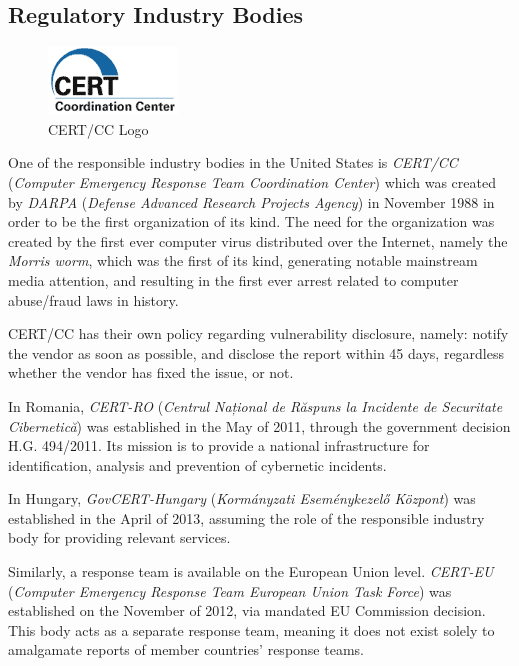 \documentclass[a4paper,12pt]{article}
\begin{document}
\subsection{Regulatory Industry Bodies}
	
	\begin{figure}
		\vspace{-10pt}
		\centering
		\includegraphics[scale=0.75]{cert.png}
		\caption{CERT/CC Logo}
	\end{figure}
	
	One of the responsible industry bodies in the United States is \textit{CERT/CC} (\textit{Computer Emergency Response Team Coordination Center}) which was created by \textit{DARPA} (\textit{Defense Advanced Research Projects Agency}) in November 1988 in order to be the first organization of its kind. The need for the organization was created by the first ever computer virus distributed over the Internet, namely the \textit{Morris worm}\cite{cert15}, which was the first of its kind, generating notable mainstream media attention, and resulting in the first ever arrest related to computer abuse/fraud laws in history.
	
	CERT/CC has their own policy regarding vulnerability disclosure, namely: notify the vendor as soon as possible, and disclose the report within 45 days, regardless whether the vendor has fixed the issue, or not.
	
	In Romania, \textit{CERT-RO} (\textit{Centrul Național de Răspuns la Incidente de Securitate Cibernetică}) was established in the May of 2011, through the government decision H.G. 494/2011\cite{certro12}. Its mission is to provide a national infrastructure for identification, analysis and prevention of cybernetic incidents.
	
	In Hungary, \textit{GovCERT-Hungary} (\textit{Kormányzati Eseménykezelő Központ}) was established in the April of 2013\cite{certhu13}, assuming the role of the responsible industry body for providing relevant services.
	
	Similarly, a response team is available on the European Union level. \textit{CERT-EU} (\textit{Computer Emergency Response Team European Union Task Force}) was established on the November of 2012\cite{certeu13}, via mandated EU Commission decision. This body acts as a separate response team, meaning it does not exist solely to amalgamate reports of member countries' response teams.
	
\end{document}
